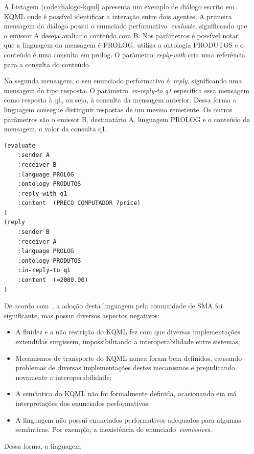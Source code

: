 A Listagem~\ref{code:dialogo-kqml} apresenta um exemplo de diálogo escrito em KQML onde é possível identificar a interação entre dois agentes. A primeira mensagem do diálogo possui o enunciado performativo~\emph{evaluate}, significando que o emissor A deseja avaliar o conteúdo com B. Nos parâmetros é possível notar que a linguagem da mensagem é PROLOG, utiliza a ontologia PRODUTOS e o conteúdo é uma consulta em prolog. O parâmetro~\emph{reply-with} cria uma referência para a consulta do conteúdo.

Na segunda mensagem, o seu enunciado performativo é~\emph{reply}, significando uma mensagem do tipo resposta. O parâmetro~\emph{in-reply-to q1} especifica essa mensagem como resposta à q1, ou seja, à consulta da mensagem anterior. Dessa forma a linguagem consegue distinguir respostas de um mesmo remetente. Os outros parâmetros são o emissor B, destinatário A, linguagem PROLOG e o conteúdo da mensagem, o valor da consulta q1.

\begin{lstlisting}[label=code:dialogo-kqml,caption=Exemplo de diálogo em KQML]
(evaluate
	:sender A
	:receiver B
	:language PROLOG
	:ontology PRODUTOS
	:reply-with q1
	:content  (PRECO COMPUTADOR ?price)
)
(reply
	:sender B
	:receiver A
	:language PROLOG
	:ontology PRODUTOS
	:in-reply-to q1
	:content  (=2000.00)
)
\end{lstlisting}

De acordo com~\cite{wooldridge04}, a adoção desta linguagem pela comunidade de SMA foi significante, mas possui diversos aspectos negativos:
\begin{itemize}
	\item A fluídez e a não restrição do KQML fez com que diversas implementações extendidas surgissem, impossibilitando a interoperabilidade entre sistemas;
	\item Mecanismos de transporte do KQML nunca foram bem definidos, causando problemas de diversas implementações destes mecanismos e prejudicando novamente a interoperabilidade;
	\item A semântica do KQML não foi formalmente definida, ocasionando em má interpretações dos enunciados performativos;
	\item A linguagem não possui enunciados performativos adequados para algumas semânticas. Por exemplo, a inexistência do enunciado~\emph{comissives}.
\end{itemize}

Dessa forma, a linguagem

